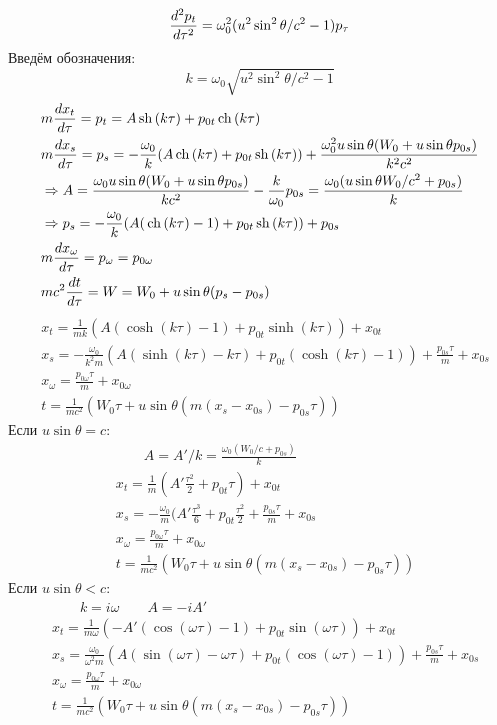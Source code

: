 \[	
	\frac{d^2 p_t}{d \tau^2} = \omega_0^2 (u^2 \sin^2 \theta/c^2 - 1) p_\tau
\]
Введём обозначения:
\[
	k = \omega_0 \sqrt{u^2 \sin^2 \theta/c^2 - 1}
\]
\[
	\begin{aligned}
	& m\frac{d x_t}{d \tau} = p_t = A \,\mathrm{sh}\, (k\tau) + p_{0t} \,\mathrm{ch}\,(k\tau) \\
	& m\frac{d x_s}{d \tau} = p_s = - \frac{\omega_0}{k} (A \,\mathrm{ch}\, (k\tau) + p_{0t} \,\mathrm{sh}\, (k\tau)) + \frac{\omega_0^2 u \sin \theta (W_0 + u \sin \theta p_{0s})}{k^2 c^2} \\
	& \Rightarrow A = \frac{\omega_0 u \sin \theta (W_0 + u \sin \theta p_{0s})}{k c^2} - \frac{k}{\omega_0} p_{0s}  = 
	\frac{\omega_0 (u \sin \theta W_0/c^2 + p_{0s})}{k} \\
	& \Rightarrow p_s = - \frac{\omega_0}{k} (A (\,\mathrm{ch}\, (k\tau) - 1) + p_{0t} \,\mathrm{sh}\, (k\tau)) + p_{0s} \\
	& m\frac{d x_\omega}{d \tau} = p_\omega = p_{0\omega} \\
	& m c^2\frac{d t}{d \tau} = W = W_0 + u \sin \theta (p_s - p_{0s})
	\end{aligned}
\]
\[
	\begin{aligned}
	& x_t = \frac{1}{mk} (A (\cosh (k\tau) - 1) + p_{0t} \sinh(k\tau)) + x_{0t} \\
	& x_s = - \frac{\omega_0}{k^2m} (A (\sinh (k\tau) - k\tau) + p_{0t} (\cosh (k\tau) - 1)) + \frac{p_{0s} \tau}{m} + x_{0s} \\
	& x_\omega = \frac{p_{0\omega} \tau}{m} + x_{0\omega} \\
	& t = \frac{1}{mc^2} (W_0 \tau + u \sin \theta (m (x_s - x_{0s}) - p_{0s} \tau))
	\end{aligned}
\]
Если $u \sin \theta = c$:
\[
	\begin{aligned}
	& \qquad A = A'/k = \frac{\omega_0 (W_0/c + p_{0s})}{k}\\
	& x_t = \frac{1}{m} (A'\frac{\tau^2}{2} + p_{0t} \tau) + x_{0t} \\
	& x_s = - \frac{\omega_0}{m} (A' \frac{\tau^3}{6} + p_{0t} \frac{\tau^2}{2} + \frac{p_{0s} \tau}{m} + x_{0s} \\
	& x_\omega = \frac{p_{0\omega} \tau}{m} + x_{0\omega} \\
	& t = \frac{1}{mc^2} (W_0 \tau + u \sin \theta (m (x_s - x_{0s}) - p_{0s} \tau))
	\end{aligned}
\]
Если $u \sin \theta < c$:
\[
	\begin{aligned}
	& \qquad k = i \omega \qquad A = - i A'\\
	& x_t = \frac{1}{m\omega} (- A' (\cos (\omega\tau) - 1) + p_{0t} \sin(\omega\tau)) + x_{0t} \\
	& x_s = \frac{\omega_0}{\omega^2m} (A (\sin (\omega \tau) - \omega \tau) + p_{0t} (\cos (\omega \tau) - 1)) + \frac{p_{0s} \tau}{m} + x_{0s} \\
	& x_\omega = \frac{p_{0\omega} \tau}{m} + x_{0\omega} \\
	& t = \frac{1}{mc^2} (W_0 \tau + u \sin \theta (m (x_s - x_{0s}) - p_{0s} \tau))
	\end{aligned}
\]
